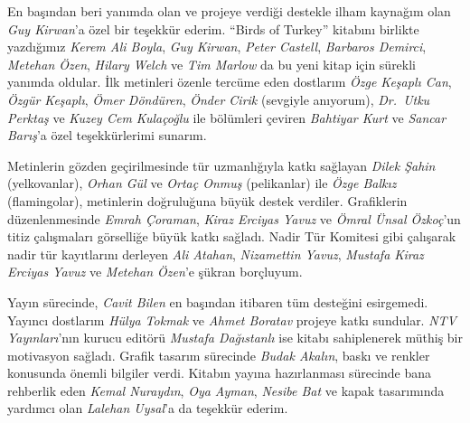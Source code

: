 \documentclass[
  a4paper,
  DIV=11,
  numbers=noendperiod]{scrreprt}
\begin{document}
En başından beri yanımda olan ve projeye verdiği destekle ilham kaynağım
olan \emph{Guy Kirwan}'a özel bir teşekkür ederim. ``Birds of Turkey''
kitabını birlikte yazdığımız \emph{Kerem Ali Boyla}, \emph{Guy Kirwan},
\emph{Peter Castell}, \emph{Barbaros Demirci}, \emph{Metehan Özen},
\emph{Hilary Welch} ve \emph{Tim Marlow} da bu yeni kitap için sürekli
yanımda oldular. İlk metinleri özenle tercüme eden dostlarım \emph{Özge
Keşaplı Can}, \emph{Özgür Keşaplı}, \emph{Ömer Döndüren}, \emph{Önder
Cirik} (sevgiyle anıyorum), \emph{Dr.~Utku Perktaş} ve \emph{Kuzey Cem
Kulaçoğlu} ile bölümleri çeviren \emph{Bahtiyar Kurt} ve \emph{Sancar
Barış}'a özel teşekkürlerimi sunarım.

Metinlerin gözden geçirilmesinde tür uzmanlığıyla katkı sağlayan
\emph{Dilek Şahin} (yelkovanlar), \emph{Orhan Gül} ve \emph{Ortaç Onmuş}
(pelikanlar) ile \emph{Özge Balkız} (flamingolar), metinlerin
doğruluğuna büyük destek verdiler. Grafiklerin düzenlenmesinde
\emph{Emrah Çoraman}, \emph{Kiraz Erciyas Yavuz} ve \emph{Ömral Ünsal
Özkoç}'un titiz çalışmaları görselliğe büyük katkı sağladı. Nadir Tür
Komitesi gibi çalışarak nadir tür kayıtlarını derleyen \emph{Ali
Atahan}, \emph{Nizamettin Yavuz}, \emph{Mustafa Kiraz Erciyas Yavuz} ve
\emph{Metehan Özen}'e şükran borçluyum.

Yayın sürecinde, \emph{Cavit Bilen} en başından itibaren tüm desteğini
esirgemedi. Yayıncı dostlarım \emph{Hülya Tokmak} ve \emph{Ahmet
Boratav} projeye katkı sundular. \emph{NTV Yayınları}'nın kurucu editörü
\emph{Mustafa Dağıstanlı} ise kitabı sahiplenerek müthiş bir motivasyon
sağladı. Grafik tasarım sürecinde \emph{Budak Akalın}, baskı ve renkler
konusunda önemli bilgiler verdi. Kitabın yayına hazırlanması sürecinde
bana rehberlik eden \emph{Kemal Nuraydın}, \emph{Oya Ayman},
\emph{Nesibe Bat} ve kapak tasarımında yardımcı olan \emph{Lalehan
Uysal}'a da teşekkür ederim.
\end{document}
